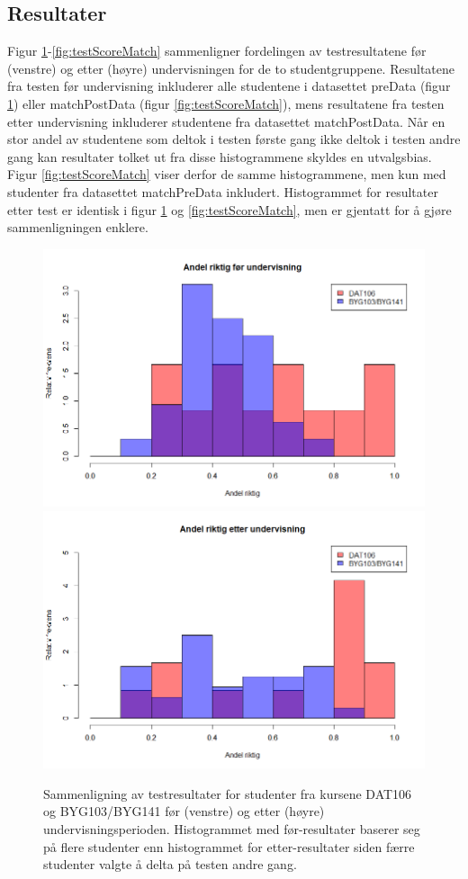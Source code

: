\documentclass[a4paper,norsk,12pt]{article}
\begin{document}
\subsection{Resultater}
Figur \ref{fig:testScore}-\ref{fig:testScoreMatch} sammenligner fordelingen av testresultatene før (venstre) og etter (høyre) undervisningen for de to studentgruppene. Resultatene fra testen før undervisning inkluderer alle studentene i datasettet preData (figur \ref{fig:testScore}) eller matchPostData (figur \ref{fig:testScoreMatch}), mens resultatene fra testen etter undervisning inkluderer studentene fra datasettet matchPostData.  Når en stor andel av studentene som deltok i testen første gang ikke deltok i testen andre gang kan resultater tolket ut fra disse histogrammene skyldes en utvalgsbias. Figur \ref{fig:testScoreMatch} viser derfor de samme histogrammene, men kun med studenter fra datasettet matchPreData inkludert. Histogrammet for resultater etter test er identisk i figur \ref{fig:testScore} og \ref{fig:testScoreMatch}, men er gjentatt for å gjøre sammenligningen enklere.
\begin{figure}[bp]
	\includegraphics[width=.48\textwidth]{./preScoreAll}
	\includegraphics[width=.48\textwidth]{./postScore}
	\caption{Sammenligning av testresultater for studenter fra kursene DAT106 og  BYG103/BYG141 før (venstre) og etter (høyre) undervisningsperioden. Histogrammet med før-resultater 
baserer seg på flere studenter enn histogrammet for etter-resultater siden færre studenter valgte å delta på testen andre gang.}
	\label{fig:testScore}
\end{figure}
\end{document}
